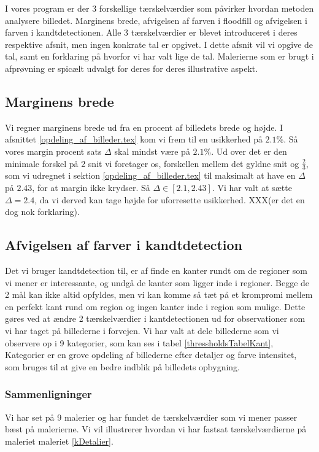 {\sffamily
I vores program er der 3 forskellige tærskelværdier som påvirker hvordan
metoden analysere billedet. Marginens brede, afvigelsen af farven i
floodfill og afvigelsen i farven i kandtdetectionen. Alle 3
tærskelværdier er blevet introduceret i deres respektive afsnit, men
ingen konkrate tal er opgivet. I dette afsnit vil vi opgive de tal, samt
en forklaring på hvorfor vi har valt lige de tal. Malerierne som er
brugt i afprøvning er spicælt udvalgt for deres for deres illustrative
aspekt. 
}

\subsection{Marginens brede}
Vi regner marginens brede ud fra en procent af billedets brede og
højde. I afsnittet \ref{opdeling_af_billeder.tex} kom vi frem til en
usikkerhed på $2.1 \%$. Så vores margin procent sats $\Delta$ skal mindst
være på $2.1 \%$. Ud over det er den minimale forskel på 2 snit vi foretager os,
forskellen mellem det gyldne snit og $\frac{2}{3}$, som vi udregnet i
sektion \ref{opdeling_af_billeder.tex} til maksimalt at have en $\Delta$ på
$2.43$, for at margin ikke krydser. Så $\Delta \in [2.1, 2.43]$. Vi har valt
at sætte $\Delta = 2.4$, da vi derved kan tage højde for uforresette
usikkerhed. XXX(er det en dog nok forklaring).

\subsection{Afvigelsen af farver i kandtdetection}
Det vi bruger kandtdetection til, er af finde en kanter rundt om de
regioner som vi mener er interessante, og undgå de kanter som ligger
inde i regioner. Begge de 2 mål kan ikke altid opfyldes, men vi kan
komme så tæt på et krompromi mellem en perfekt kant rund om region og
ingen kanter inde i region som mulige. Dette gøres ved at ændre 2
tærskelværdier i kantdetectionen ud for observationer som vi har taget
på billederne i forvejen. Vi har valt at dele billederne som vi
observere op i 9 kategorier, som kan ses i tabel
\ref{thressholdsTabelKant}, Kategorier er en grove opdeling af
billederne efter detaljer og farve intensitet, som bruges til at give en
bedre indblik på billedets opbygning. 

\subsubsection{Sammenligninger}
Vi har set på 9 malerier og har fundet de tærskelværdier som vi mener
passer bæst på malerierne. Vi vil illustrerer hvordan vi har fastsat
tærskelværdierne på maleriet maleriet \ref{kDetalier}.

